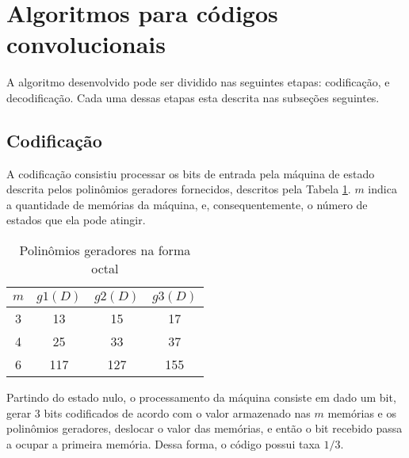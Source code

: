 \section{Algoritmos para códigos convolucionais}
A algoritmo desenvolvido pode ser dividido nas seguintes etapas: codificação, e decodificação. Cada uma dessas etapas esta descrita nas subseções seguintes.

\subsection{Codificação}


A codificação consistiu processar os bits de entrada pela máquina de estado descrita pelos polinômios geradores fornecidos, descritos pela Tabela \ref{tab:polinomios_geradores}. $m$ indica a quantidade de memórias da máquina, e, consequentemente, o número de estados que ela pode atingir.

\begin{table}[h!]
	\centering
	\caption{Polinômios geradores na forma octal}
	\label{tab:polinomios_geradores}
	\begin{tabular}{|c|c|c|c|}
		\hline
		$m$ & $g1(D)$ & $g2(D)$ & $g3(D)$ \\ \hline\hline
		 3  &   13    &   15    &   17    \\ \hline
		 4  &   25    &   33    &   37    \\ \hline
		 6  &   117   &   127   &   155   \\ \hline
	\end{tabular} 
\end{table}

Partindo do estado nulo, o processamento da máquina consiste em dado um bit, gerar 3 bits codificados de acordo com o valor armazenado nas $m$ memórias e os polinômios geradores, deslocar o valor das memórias, e então o bit recebido passa a ocupar a primeira memória. Dessa forma, o código possui taxa $1/3$.

%
%


